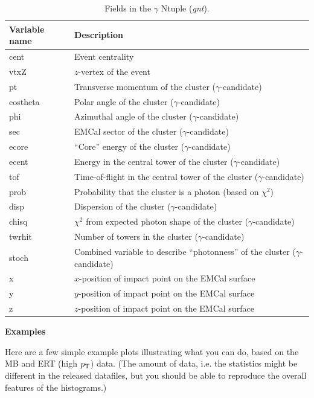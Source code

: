 \documentclass[12pt,letterpaper,aps,prc,superscriptaddress,showpacs,
longbibliography,nofootinbib,floatfix,onecolumn]{revtex4-1}
\newcommand{\pt}{\mbox{$p_{\rm T}$}\xspace}
\begin{document}
\begin{table}[h]
  \begin{tabular}{|l|l|} \hline
    Variable name & Description \\ \hline
    cent & Event centrality \\
    vtxZ & $z$-vertex of the event \\
    pt   & Transverse momentum of the cluster ($\gamma$-candidate) \\
    costheta & Polar angle of the cluster ($\gamma$-candidate) \\    
    phi & Azimuthal angle of the cluster ($\gamma$-candidate) \\
    sec & EMCal sector of the cluster ($\gamma$-candidate) \\
    ecore & ``Core'' energy of the cluster ($\gamma$-candidate) \\
    ecent & Energy in the central tower of the cluster ($\gamma$-candidate) \\
    tof   & Time-of-flight in the central tower of the cluster ($\gamma$-candidate) \\
    prob & Probability that the cluster is a photon (based on $\chi^2$) \\
    disp & Dispersion of the cluster ($\gamma$-candidate) \\
    chisq & $\chi^2$ from expected photon shape of the cluster ($\gamma$-candidate) \\
    twrhit & Number of towers in the cluster ($\gamma$-candidate) \\
    stoch & Combined variable to describe ``photonness'' of the cluster ($\gamma$-candidate) \\
    x & $x$-position of impact point on the EMCal surface \\
    y & $y$-position of impact point on the EMCal surface \\
    z & $z$-position of impact point on the EMCal surface \\ \hline
  \end{tabular}
  \vspace{0.3cm}
  \caption{Fields in the $\gamma$ Ntuple ({\it gnt}).
}
  \label{tab:gnt}
 \end{table}

\newpage
{\bf Examples} \\
\vspace{0.05in}

\noindent
Here are a few simple example plots illustrating what you can do,
based on the MB and ERT (high \pt) data.  (The amount of data, i.e. the
statistics might be different in the released datafiles, but you
should be able to reproduce the overall features of the histograms.)
\end{document}
